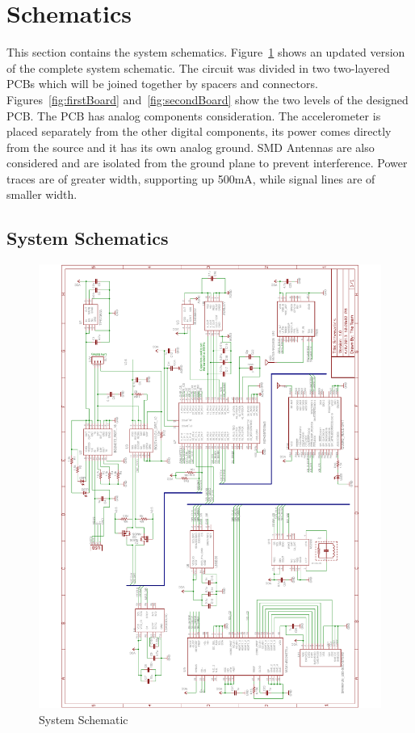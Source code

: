 \section{Schematics}

This section contains the system schematics. Figure~\ref{fig:systemSchematics} shows an updated version of the complete system schematic.  The circuit was divided in two two-layered PCBs which will be joined together by spacers and connectors. Figures~\ref{fig:firstBoard} and~\ref{fig:secondBoard} show the two levels of the designed PCB. The PCB has analog components consideration. The accelerometer is placed separately from the other digital components, its power comes directly from the source and it has its own analog ground. SMD Antennas are also considered and are isolated from the ground plane to prevent interference. Power traces are of greater width, supporting up 500mA, while signal lines are of smaller width. 
\subsection{System Schematics}
\begin{figure}[H]
\centering
	\includegraphics[width=\textwidth]{img/CompleteSchematics}
	\caption{System Schematic \label{fig:systemSchematics}}
\end{figure}

